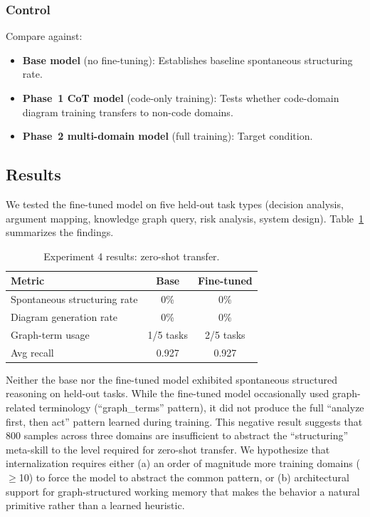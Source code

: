 \documentclass[11pt,a4paper]{article}
\begin{document}
\subsubsection{Control}

Compare against:
\begin{itemize}[nosep]
\item \textbf{Base model} (no fine-tuning): Establishes baseline spontaneous structuring rate.
\item \textbf{Phase~1 CoT model} (code-only training): Tests whether code-domain diagram training transfers to non-code domains.
\item \textbf{Phase~2 multi-domain model} (full training): Target condition.
\end{itemize}

\subsection{Results}

We tested the fine-tuned model on five held-out task types (decision analysis, argument mapping, knowledge graph query, risk analysis, system design). Table~\ref{tab:exp4_res} summarizes the findings.

\begin{table}[h]
\centering
\caption{Experiment 4 results: zero-shot transfer.}
\label{tab:exp4_res}
\begin{tabular}{lcc}
\toprule
\textbf{Metric} & \textbf{Base} & \textbf{Fine-tuned} \\
\midrule
Spontaneous structuring rate & 0\% & 0\% \\
Diagram generation rate      & 0\% & 0\% \\
Graph-term usage             & 1/5 tasks & 2/5 tasks \\
Avg recall                   & 0.927 & 0.927 \\
\bottomrule
\end{tabular}
\end{table}

Neither the base nor the fine-tuned model exhibited spontaneous structured reasoning on held-out tasks. While the fine-tuned model occasionally used graph-related terminology (``graph\_terms'' pattern), it did not produce the full ``analyze first, then act'' pattern learned during training. This negative result suggests that 800 samples across three domains are insufficient to abstract the ``structuring'' meta-skill to the level required for zero-shot transfer. We hypothesize that internalization requires either (a) an order of magnitude more training domains ($\geq$10) to force the model to abstract the common pattern, or (b) architectural support for graph-structured working memory that makes the behavior a natural primitive rather than a learned heuristic.
\end{document}
